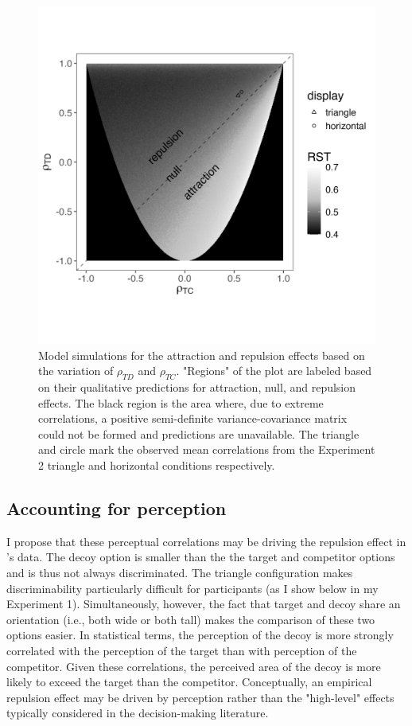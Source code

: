 {{\begin{figure}
   \includegraphics[width=\linewidth]{figures/3d_sim_rst.jpg}
   \caption{Model simulations for the attraction and repulsion effects based on the variation of $\rho_{TD}$ and $\rho_{TC}$. "Regions" of the plot are labeled based on their qualitative predictions for attraction, null, and repulsion effects. The black region is the area where, due to extreme correlations, a positive semi-definite variance-covariance matrix could not be formed and predictions are unavailable. The triangle and circle mark the observed mean correlations from the Experiment 2 triangle and horizontal conditions respectively.}
   \label{fig:3d_model}
\end{figure}

\subsection{Accounting for perception}
I propose that these perceptual correlations may be driving the repulsion effect in \textcite{spektorWhenGoodLooks2018b}'s data. The decoy option is smaller than the the target and competitor options and is thus not always discriminated. The triangle configuration makes discriminability particularly difficult for participants (as I show below in my Experiment 1). Simultaneously, however, the fact that target and decoy share an orientation (i.e., both wide or both tall) makes the comparison of these two options easier. In statistical terms, the perception of the decoy is more strongly correlated with the perception of the target than with perception of the competitor. Given these correlations, the perceived area of the decoy is more likely to exceed the target than the competitor. Conceptually, an empirical repulsion effect may be driven by perception rather than the "high-level" effects typically considered in the decision-making literature.

}}
